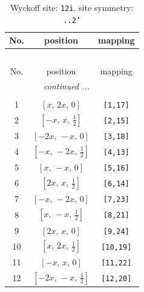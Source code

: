 \documentclass[fleqn,8pt]{jsarticle}
\begin{document}
\begin{longtable}{ccc}
\caption{Wyckoff site: {\tt 12i}, site symmetry: {\tt ..2'}}
 \\
 \hline \hline
No. & position & mapping \\ \hline \endfirsthead

\multicolumn{2}{l}{\tablename\ \thetable{}} \\
 \hline \hline
No. & position & mapping \\ \hline \endhead

 \hline \hline
\multicolumn{2}{r}{\footnotesize\it continued ...} \\ \endfoot

 \hline \hline
\multicolumn{2}{r}{} \\ \endlastfoot

1 & $\left[ x,\, 2 x,\, 0 \right]$ & {\tt [1,17]} \\ \hline
2 & $\left[ - x,\, x,\, \frac{1}{2} \right]$ & {\tt [2,15]} \\ \hline
3 & $\left[ - 2 x,\, - x,\, 0 \right]$ & {\tt [3,18]} \\ \hline
4 & $\left[ - x,\, - 2 x,\, \frac{1}{2} \right]$ & {\tt [4,13]} \\ \hline
5 & $\left[ x,\, - x,\, 0 \right]$ & {\tt [5,16]} \\ \hline
6 & $\left[ 2 x,\, x,\, \frac{1}{2} \right]$ & {\tt [6,14]} \\ \hline
7 & $\left[ - x,\, - 2 x,\, 0 \right]$ & {\tt [7,23]} \\ \hline
8 & $\left[ x,\, - x,\, \frac{1}{2} \right]$ & {\tt [8,21]} \\ \hline
9 & $\left[ 2 x,\, x,\, 0 \right]$ & {\tt [9,24]} \\ \hline
10 & $\left[ x,\, 2 x,\, \frac{1}{2} \right]$ & {\tt [10,19]} \\ \hline
11 & $\left[ - x,\, x,\, 0 \right]$ & {\tt [11,22]} \\ \hline
12 & $\left[ - 2 x,\, - x,\, \frac{1}{2} \right]$ & {\tt [12,20]} \\
\end{longtable}
\renewcommand{\arraystretch}{1.2}
\end{document}
